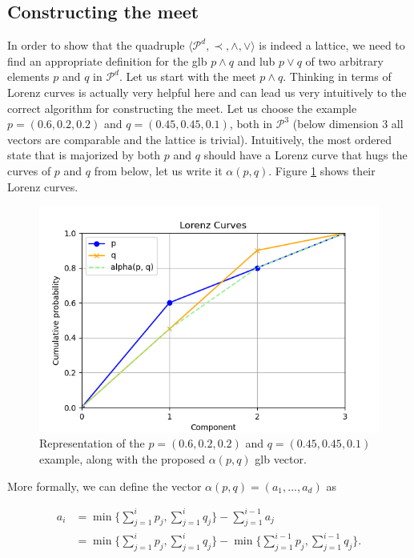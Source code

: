 \subsection{Constructing the meet} \label{sec:meet}

In order to show that the quadruple $\langle \mathcal{P}^d, \prec, \wedge, \vee \rangle$ is indeed a lattice, we need to find an appropriate definition for the glb $p \wedge q$ and lub $p \vee q$ of two arbitrary elements $p$ and $q$ in $\mathcal{P}^d$. Let us start with the meet $p \wedge q$. Thinking in terms of Lorenz curves is actually very helpful here and can lead us very intuitively to the correct algorithm for constructing the meet. Let us choose the example $p = (0.6, 0.2, 0.2)$ and $q = (0.45, 0.45, 0.1)$, both in $\mathcal{P}^3$ (below dimension 3 all vectors are comparable and the lattice is trivial). Intuitively, the most ordered state that is majorized by both $p$ and $q$ should have a Lorenz curve that hugs the curves of $p$ and $q$ from below, let us write it $\alpha(p, q)$. Figure \ref{fig:meet_attempt} shows their Lorenz curves.

\begin{figure}[h!]
    \centering
    \includegraphics[scale=0.6]{images/meet_intuition.png}
    \caption{Representation of the $p = (0.6, 0.2, 0.2)$ and $q = (0.45, 0.45, 0.1)$ example, along with the proposed $\alpha(p, q)$ glb vector.} \label{fig:meet_attempt}
\end{figure}

\noindent More formally, we can define the vector $\alpha(p, q) = (a_1, ..., a_d)$ as

\begin{align}
    a_i &= \min \Big\{ \sum_{j=1}^{i} p_j , \sum_{j=1}^{i} q_j \Big\} - \sum_{j=1}^{i-1} a_j \label{eq:alpha_bis} \\
    &= \min \Big\{ \sum_{j=1}^{i} p_j , \sum_{j=1}^{i} q_j \Big\} - \min \Big\{ \sum_{j=1}^{i-1} p_j , \sum_{j=1}^{i-1} q_j \Big\}. \label{eq:alpha}
\end{align}

